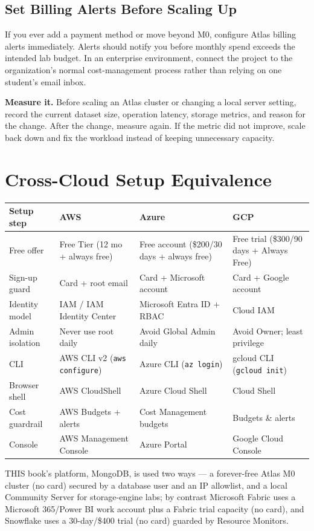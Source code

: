 \subsection{Set Billing Alerts Before Scaling Up}
If you ever add a payment method or move beyond M0, configure Atlas billing alerts immediately. Alerts should notify you before monthly spend exceeds the intended lab budget. In an enterprise environment, connect the project to the organization's normal cost-management process rather than relying on one student's email inbox.

\begin{tipbox}
\textbf{Measure it.} Before scaling an Atlas cluster or changing a local server setting, record the current dataset size, operation latency, storage metrics, and reason for the change. After the change, measure again. If the metric did not improve, scale back down and fix the workload instead of keeping unnecessary capacity.
\end{tipbox}

\section{Cross-Cloud Setup Equivalence}
\begin{crosscloud}
{\footnotesize
\begin{tabular}{@{}p{2.9cm}p{3.0cm}p{3.0cm}p{3.0cm}@{}}
\toprule
\textbf{Setup step} & \textbf{AWS} & \textbf{Azure} & \textbf{GCP} \\
\midrule
Free offer & Free Tier (12 mo + always free) & Free account (\$200/30 days + always free) & Free trial (\$300/90 days + Always Free) \\
Sign-up guard & Card + root email & Card + Microsoft account & Card + Google account \\
Identity model & IAM / IAM Identity Center & Microsoft Entra ID + RBAC & Cloud IAM \\
Admin isolation & Never use root daily & Avoid Global Admin daily & Avoid Owner; least privilege \\
CLI & AWS CLI v2 (\texttt{aws configure}) & Azure CLI (\texttt{az login}) & gcloud CLI (\texttt{gcloud init}) \\
Browser shell & AWS CloudShell & Azure Cloud Shell & Cloud Shell \\
Cost guardrail & AWS Budgets + alerts & Cost Management budgets & Budgets \& alerts \\
Console & AWS Management Console & Azure Portal & Google Cloud Console \\
\bottomrule
\end{tabular}}

THIS book's platform, MongoDB, is used two ways — a forever-free Atlas M0 cluster (no card) secured by a database user and an IP allowlist, and a local Community Server for storage-engine labs; by contrast Microsoft Fabric uses a Microsoft 365/Power BI work account plus a Fabric trial capacity (no card), and Snowflake uses a 30-day/\$400 trial (no card) guarded by Resource Monitors.
\end{crosscloud}

